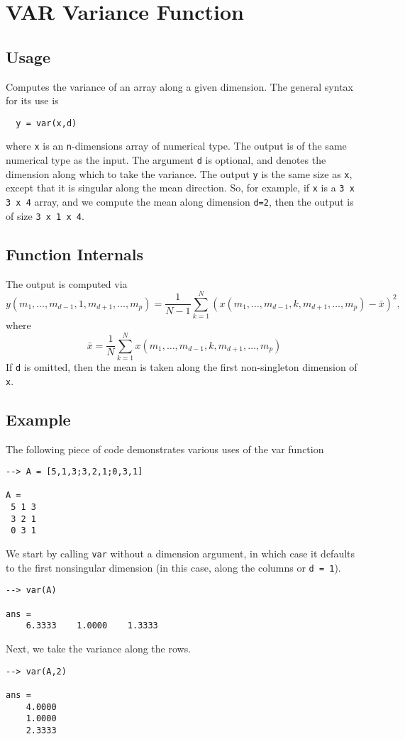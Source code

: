 \section{VAR Variance Function}

\subsection{Usage}

Computes the variance of an array along a given dimension.  The general
syntax for its use is
\begin{verbatim}
  y = var(x,d)
\end{verbatim}
where \verb|x| is an \verb|n|-dimensions array of numerical type.
The output is of the same numerical type as the input.  The argument
\verb|d| is optional, and denotes the dimension along which to take
the variance.  The output \verb|y| is the same size as \verb|x|, except
that it is singular along the mean direction.  So, for example,
if \verb|x| is a \verb|3 x 3 x 4| array, and we compute the mean along
dimension \verb|d=2|, then the output is of size \verb|3 x 1 x 4|.
\subsection{Function Internals}

The output is computed via
\[
y(m_1,\ldots,m_{d-1},1,m_{d+1},\ldots,m_{p}) = \frac{1}{N-1}
\sum_{k=1}^{N} \left(x(m_1,\ldots,m_{d-1},k,m_{d+1},\ldots,m_{p}) 
 - \bar{x}\right)^2,
\]
where 
\[
\bar{x}  = \frac{1}{N}
\sum_{k=1}^{N} x(m_1,\ldots,m_{d-1},k,m_{d+1},\ldots,m_{p})
\]
If \verb|d| is omitted, then the mean is taken along the 
first non-singleton dimension of \verb|x|. 
\subsection{Example}

The following piece of code demonstrates various uses of the var
function
\begin{verbatim}
--> A = [5,1,3;3,2,1;0,3,1]

A = 
 5 1 3 
 3 2 1 
 0 3 1 
\end{verbatim}
We start by calling \verb|var| without a dimension argument, in which 
case it defaults to the first nonsingular dimension (in this case, 
along the columns or \verb|d = 1|).
\begin{verbatim}
--> var(A)

ans = 
    6.3333    1.0000    1.3333 
\end{verbatim}
Next, we take the variance along the rows.
\begin{verbatim}
--> var(A,2)

ans = 
    4.0000 
    1.0000 
    2.3333 
\end{verbatim}

